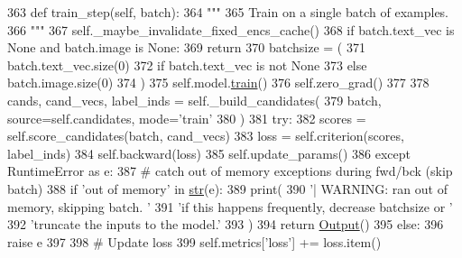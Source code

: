 \begin{DoxyCode}
363     \textcolor{keyword}{def }train\_step(self, batch):
364         \textcolor{stringliteral}{"""}
365 \textcolor{stringliteral}{        Train on a single batch of examples.}
366 \textcolor{stringliteral}{        """}
367         self.\_maybe\_invalidate\_fixed\_encs\_cache()
368         \textcolor{keywordflow}{if} batch.text\_vec \textcolor{keywordflow}{is} \textcolor{keywordtype}{None} \textcolor{keywordflow}{and} batch.image \textcolor{keywordflow}{is} \textcolor{keywordtype}{None}:
369             \textcolor{keywordflow}{return}
370         batchsize = (
371             batch.text\_vec.size(0)
372             \textcolor{keywordflow}{if} batch.text\_vec \textcolor{keywordflow}{is} \textcolor{keywordflow}{not} \textcolor{keywordtype}{None}
373             \textcolor{keywordflow}{else} batch.image.size(0)
374         )
375         self.model.\hyperlink{namespaceprojects_1_1mastering__the__dungeon_1_1mturk_1_1tasks_1_1MTD_1_1run_a36a5f4f6f9df0611a6818610518d2cf0}{train}()
376         self.zero\_grad()
377 
378         cands, cand\_vecs, label\_inds = self.\_build\_candidates(
379             batch, source=self.candidates, mode=\textcolor{stringliteral}{'train'}
380         )
381         \textcolor{keywordflow}{try}:
382             scores = self.score\_candidates(batch, cand\_vecs)
383             loss = self.criterion(scores, label\_inds)
384             self.backward(loss)
385             self.update\_params()
386         \textcolor{keywordflow}{except} RuntimeError \textcolor{keyword}{as} e:
387             \textcolor{comment}{# catch out of memory exceptions during fwd/bck (skip batch)}
388             \textcolor{keywordflow}{if} \textcolor{stringliteral}{'out of memory'} \textcolor{keywordflow}{in} \hyperlink{namespacegenerate__task__READMEs_a5b88452ffb87b78c8c85ececebafc09f}{str}(e):
389                 print(
390                     \textcolor{stringliteral}{'| WARNING: ran out of memory, skipping batch. '}
391                     \textcolor{stringliteral}{'if this happens frequently, decrease batchsize or '}
392                     \textcolor{stringliteral}{'truncate the inputs to the model.'}
393                 )
394                 \textcolor{keywordflow}{return} \hyperlink{namespaceparlai_1_1agents_1_1legacy__agents_1_1seq2seq_1_1torch__agent__v1_a2689006ea97d09413fb242f984bd8016}{Output}()
395             \textcolor{keywordflow}{else}:
396                 \textcolor{keywordflow}{raise} e
397 
398         \textcolor{comment}{# Update loss}
399         self.metrics[\textcolor{stringliteral}{'loss'}] += loss.item()

\end{DoxyCode}
